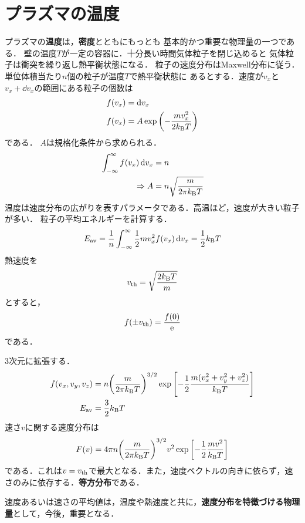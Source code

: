 \documentclass{report}
\begin{document}
\section{プラズマの温度}
  プラズマの\textbf{温度}は，\textbf{密度}とともにもっとも
  基本的かつ重要な物理量の一つである．
  壁の温度$T$が一定の容器に．十分長い時間気体粒子を閉じ込めると
  気体粒子は衝突を繰り返し熱平衡状態になる．
  粒子の速度分布はMaxwell分布に従う．単位体積当たり$n$個の粒子が温度$T$で熱平衡状態に
  あるとする．速度が$v_x$と$v_x + \dd{v_x}$の範囲にある粒子の個数は
  \begin{align}
    f(v_x) &= \dd{v_x}\\
    f(v_x) &= A \exp\qty(-\frac{mv_x^2}{2k_{\mathrm{B}} T})
  \end{align}
  である．
  $A$は規格化条件から求められる．
  \begin{align}
    \int_{-\infty}^{\infty} f(v_x) \dd{v_x} &= n\\
    \Rightarrow A &= n\sqrt{\frac{m}{2\pi k_{\mathrm{B}} T}}
  \end{align}
  温度は速度分布の広がりを表すパラメータである．高温ほど，速度が大きい粒子が多い．
  粒子の平均エネルギーを計算する．
  \begin{align}
    E_{\mathrm{av}} = \frac{1}{n}\int_{-\infty}^{\infty} \frac{1}{2}mv_x^2f(v_x) \dd{v_x} = \frac{1}{2}k_{\mathrm{B}} T
  \end{align}
  熱速度を
  \begin{align}
    v_{\mathrm{th}} = \sqrt{\frac{2k_{\mathrm{B}} T}{m}}
  \end{align}
  とすると，
  \begin{align}
    f(\pm v_{\mathrm{th}}) = \frac{f(0)}{\mathrm{e}}
  \end{align}
  である．
  \par
  3次元に拡張する．
  \begin{align}
    f(v_x, v_y, v_z) &= n\qty(\frac{m}{2\pi k_{\mathrm{B}} T})^{3/2} \exp\qty[-\frac{1}{2}\frac{m(v_x^2 + v_y^2 + v_z^2)}{k_{\mathrm{B}} T}]\\
    E_{\mathrm{av}} &= \frac{3}{2}k_{\mathrm{B}} T
  \end{align}
  速さ$v$に関する速度分布は
  \begin{align}
    F(v) = 4\pi n \qty(\frac{m}{2\pi k_{\mathrm{B}} T})^{3/2} v^2 \exp\qty[-\frac{1}{2}\frac{mv^2}{k_{\mathrm{B}} T}]
  \end{align}
  である．これは$v = v_{\mathrm{th}}$で最大となる．また，速度ベクトルの向きに依らず，速さのみに依存する．\textbf{等方分布}である．
  \par
  速度あるいは速さの平均値は，温度や熱速度と共に，\textbf{速度分布を特徴づける物理量}として，今後，重要となる．
\end{document}
